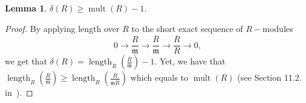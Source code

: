 \documentclass{article}
\newtheorem{lemma}[theorem]{Lemma}
\DeclareMathOperator{\length}{length}
\DeclareMathOperator{\Spec}{Spec}
\DeclareMathOperator{\edim}{edim}
\DeclareMathOperator{\mult}{mult}
\numberwithin{theorem}{section}
\begin{document}




\begin{lemma}\label{cor:edim_bound}
    $\delta(R) \geq \mult(R)-1$. 
\end{lemma}

\begin{proof}
    By applying length over $R$ to the short exact sequence of $R-$modules 
    \begin{equation*}
        0 \to \frac{R}{\mathfrak{m}} \to \frac{\overline{R}}{\mathfrak{m}} \to \frac{\overline{R}}{R} \to 0,
    \end{equation*}
    \noindent we get that $\delta(R)=\length_R\left(\frac{\overline{R}}{\mathfrak{m}}\right)-1$. Yet, we have that $\length_R\left(\frac{\overline{R}}{\mathfrak{m}}\right) \geq \length_R\left(\frac{\overline{R}}{\mathfrak{m}\overline{R}}\right)$ which equals to $\mult(R)$ (see Section 11.2. in~\cite{huneke2006integral}). 
\end{proof}
\end{document}
